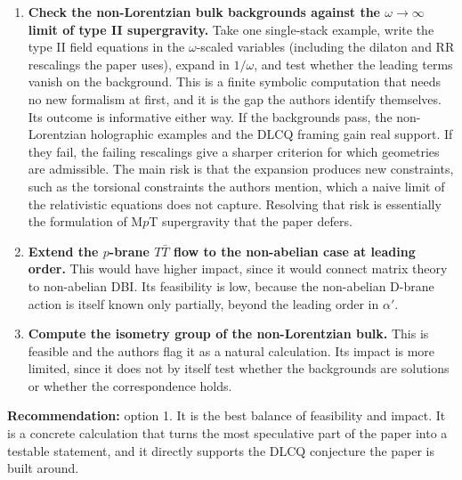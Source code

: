\documentclass[11pt]{article}
\begin{document}
\begin{enumerate}
\item \textbf{Check the non-Lorentzian bulk backgrounds against the $\omega\to\infty$ limit of type II supergravity.} Take one single-stack example, write the type II field equations in the $\omega$-scaled variables (including the dilaton and RR rescalings the paper uses), expand in $1/\omega$, and test whether the leading terms vanish on the background. This is a finite symbolic computation that needs no new formalism at first, and it is the gap the authors identify themselves. Its outcome is informative either way. If the backgrounds pass, the non-Lorentzian holographic examples and the DLCQ framing gain real support. If they fail, the failing rescalings give a sharper criterion for which geometries are admissible. The main risk is that the expansion produces new constraints, such as the torsional constraints the authors mention, which a naive limit of the relativistic equations does not capture. Resolving that risk is essentially the formulation of M$p$T supergravity that the paper defers.

\item \textbf{Extend the $p$-brane $T\bar{T}$ flow to the non-abelian case at leading order.} This would have higher impact, since it would connect matrix theory to non-abelian DBI. Its feasibility is low, because the non-abelian D-brane action is itself known only partially, beyond the leading order in $\alpha'$.

\item \textbf{Compute the isometry group of the non-Lorentzian bulk.} This is feasible and the authors flag it as a natural calculation. Its impact is more limited, since it does not by itself test whether the backgrounds are solutions or whether the correspondence holds.
\end{enumerate}

\textbf{Recommendation:} option 1. It is the best balance of feasibility and impact. It is a concrete calculation that turns the most speculative part of the paper into a testable statement, and it directly supports the DLCQ conjecture the paper is built around.
\end{document}
